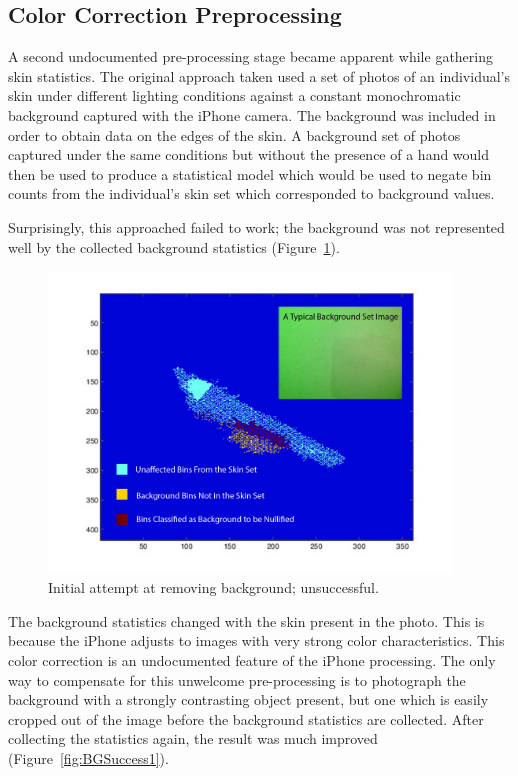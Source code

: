 \subsection{Color Correction Preprocessing}
A second undocumented pre-processing stage became apparent while gathering skin statistics. The original approach taken used a set of photos of an individual's skin  under different lighting conditions against a constant monochromatic background captured with the iPhone camera. The background was included in order to obtain data on the edges of the skin. A background set of photos captured under the same conditions but without the presence of a hand would then be used to produce a statistical model which would be used to negate bin counts from the individual's skin set which corresponded to background values.

Surprisingly, this approached failed to work; the background was not represented well by the collected background statistics (Figure~\ref{fig:BGFailure}).

\begin{figure}[h!]
  \centering
    \includegraphics[width=0.95\textwidth]{Chapter3/Figs/CaCb_bg_failed.jpg}
    \caption{Initial attempt at removing background; unsuccessful.} \label{fig:BGFailure}
\end{figure}

The background statistics changed with the skin present in the photo. This is because the iPhone adjusts to images with very strong color characteristics. This color correction is an undocumented feature of the iPhone processing. The only way to compensate for this unwelcome pre-processing is to photograph the background with a strongly contrasting object present, but one which is easily cropped out of the image before the background statistics are collected. After collecting the statistics again, the result was much improved (Figure~\ref{fig:BGSuccess1}).

